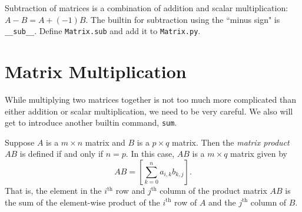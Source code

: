 \documentclass[m3380-lec-main.tex]{subfiles}
\begin{document}
\begin{exc} Subtraction of matrices is a combination of addition and scalar multiplication: $A-B=A+(-1)B$. The builtin for subtraction using the ``minus sign" is \verb|__sub__|. Define \verb|Matrix.sub| and add it to \verb|Matrix.py|.
\end{exc}

\section{Matrix Multiplication} While multiplying two matrices together is not too much more complicated than either addition or scalar multiplication, we need to be very careful. We also will get to introduce another builtin command, \verb|sum|.

\begin{defn} Suppose $A$ is a $m\times n$ matrix and $B$ is a $p\times q$ matrix. Then the \emph{matrix product $AB$} is defined if and only if $n=p$. In this case, $AB$ is a $m\times q$ matrix given by
\[AB = \left[\sum_{k=0}^n a_{i,k}b_{k,j}\right]. \] That is, the element in the $i^\text{th}$ row and $j^\text{th}$ column of the product matrix $AB$ is the sum of the element-wise product of the $i^\text{th}$ row of $A$ and the $j^\text{th}$ column of $B$.
\end{defn}
\end{document}
